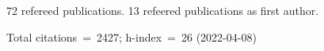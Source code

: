 72 refereed publications. 13 refeered publications as first author.

Total citations~=~2427; h-index~=~26 (2022-04-08)